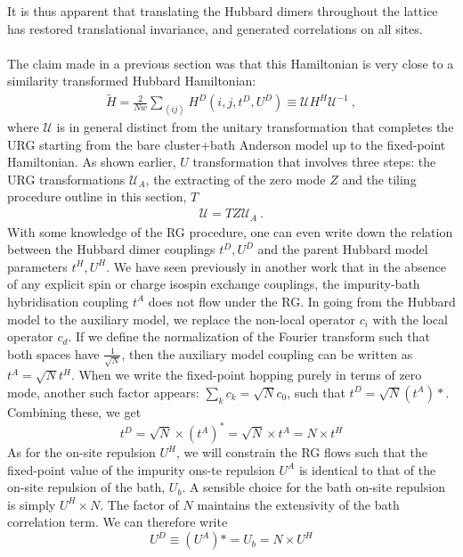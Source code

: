 \documentclass[12pt]{article}
\numberwithin{equation}{section}
\begin{document}
It is thus apparent that translating the Hubbard dimers throughout the lattice has restored translational invariance, and generated correlations on all sites. 
\\\\
The claim made in a previous section was that this Hamiltonian is very close to a similarity transformed Hubbard Hamiltonian:
\begin{equation}\begin{aligned}
	\tilde{H} = \frac{2}{Nw}\sum_{\left<ij \right>} H^D(i,j,t^D, U^D) \equiv  \mathcal{U} H^H  \mathcal{U}^{-1}~,
\end{aligned}\end{equation}
where $\mathcal{U}$ is in general distinct from the unitary transformation that completes the URG starting from the bare cluster+bath Anderson model up to the fixed-point Hamiltonian. As shown earlier, $U$ transformation that involves three steps: the URG transformations $\mathcal{U}_A$, the extracting of the zero mode $Z$ and the tiling procedure outline in this section, $T$
\begin{equation}\begin{aligned}
	\mathcal{U} = T Z \mathcal{U}_{A}~.
\end{aligned}\end{equation}
With some knowledge of the RG procedure, one can even write down the relation between the Hubbard dimer couplings $t^D, U^D$ and the parent Hubbard model parameters $t^H, U^H$. We have seen previously in another work that in the absence of any explicit spin or charge isospin exchange couplings, the impurity-bath hybridisation coupling $t^A$ does not flow under the RG. In going from the Hubbard model to the auxiliary model, we replace the non-local operator $c_i$ with the local operator $c_d$. If we define the normalization of the Fourier transform such that both spaces have $\frac{1}{\sqrt N}$, then the auxiliary model coupling can be written as $t^A = \sqrt N t^H$. When we write the fixed-point hopping purely in terms of zero mode, another such factor appears: $\sum_k c_k = \sqrt N c_0$, such that $t^D = \sqrt N (t^A)*$. Combining these, we get
\[ t^D = \sqrt N \times (t^A)^* = \sqrt N \times t^A = N \times t^H \]
As for the on-site repulsion $U^H$, we will constrain the RG flows such that the fixed-point value of the impurity ons-te repulsion $U^A$ is identical to that of the on-site repulsion of the bath, $U_b$. A sensible choice for the bath on-site repulsion is simply $U^H\times N$. The factor of $N$ maintains the extensivity of the bath correlation term. We can therefore write
\[U^D \equiv (U^A)* = U_b = N \times U^H\]
\end{document}
